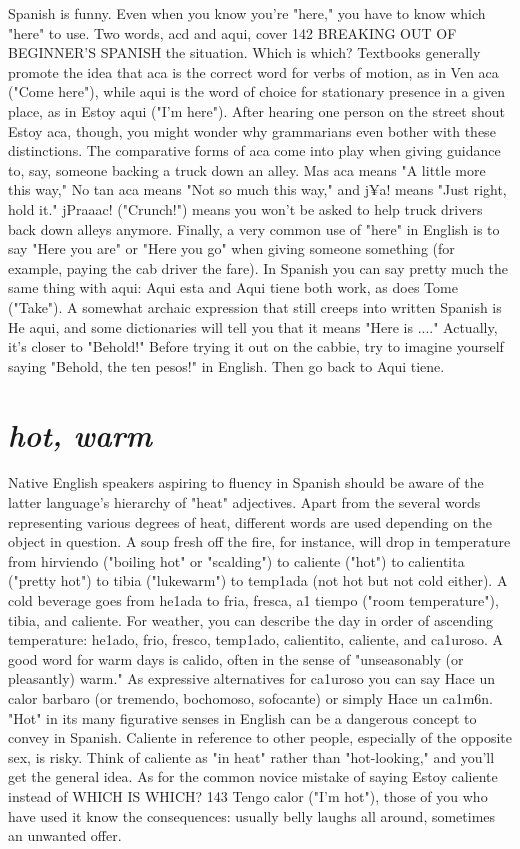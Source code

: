\documentclass[14pt,a4paper,oneside]{memoir}
\begin{document}
Spanish is funny. Even when you know you're "here," you
have to know which "here" to use. Two words, acd and aqui, cover
142 BREAKING OUT OF BEGINNER'S SPANISH
the situation. Which is which? Textbooks generally promote the idea
that aca is the correct word for verbs of motion, as in Ven aca ("Come
here"), while aqui is the word of choice for stationary presence in a
given place, as in Estoy aqui ("I'm here"). After hearing one person on
the street shout Estoy aca, though, you might wonder why grammarians even bother with these distinctions.
The comparative forms of aca come into play when giving
guidance to, say, someone backing a truck down an alley. Mas aca
means "A little more this way," No tan aca means "Not so much this
way," and j¥a! means "Just right, hold it." jPraaac! ("Crunch!") means
you won't be asked to help truck drivers back down alleys anymore.
Finally, a very common use of "here" in English is to say
"Here you are" or "Here you go" when giving someone something (for
example, paying the cab driver the fare). In Spanish you can say pretty
much the same thing with aqui: Aqui esta and Aqui tiene both work,
as does Tome ("Take"). A somewhat archaic expression that still creeps
into written Spanish is He aqui, and some dictionaries will tell you
that it means "Here is ...." Actually, it's closer to "Behold!" Before
trying it out on the cabbie, try to imagine yourself saying "Behold, the
ten pesos!" in English. Then go back to Aqui tiene.

\section{\emph{hot, warm}}

Native English speakers aspiring to fluency in Spanish should
be aware of the latter language's hierarchy of "heat" adjectives. Apart
from the several words representing various degrees of heat, different
words are used depending on the object in question. A soup fresh off
the fire, for instance, will drop in temperature from hirviendo ("boiling
hot" or "scalding") to caliente ("hot") to calientita ("pretty hot") to
tibia ("lukewarm") to temp1ada (not hot but not cold either). A cold
beverage goes from he1ada to fria, fresca, a1 tiempo ("room temperature"), tibia, and caliente. For weather, you can describe the day in order of ascending temperature: he1ado, frio, fresco, temp1ado, calientito, caliente, and ca1uroso. A good word for warm days is calido, often
in the sense of "unseasonably (or pleasantly) warm." As expressive alternatives for ca1uroso you can say Hace un calor barbaro (or tremendo, bochomoso, sofocante) or simply Hace un ca1m6n.
"Hot" in its many figurative senses in English can be a dangerous concept to convey in Spanish. Caliente in reference to other
people, especially of the opposite sex, is risky. Think of caliente as
"in heat" rather than "hot-looking," and you'll get the general idea. As
for the common novice mistake of saying Estoy caliente instead of
WHICH IS WHICH? 143
Tengo calor ("I'm hot"), those of you who have used it know the consequences: usually belly laughs all around, sometimes an unwanted offer.
\end{document}
